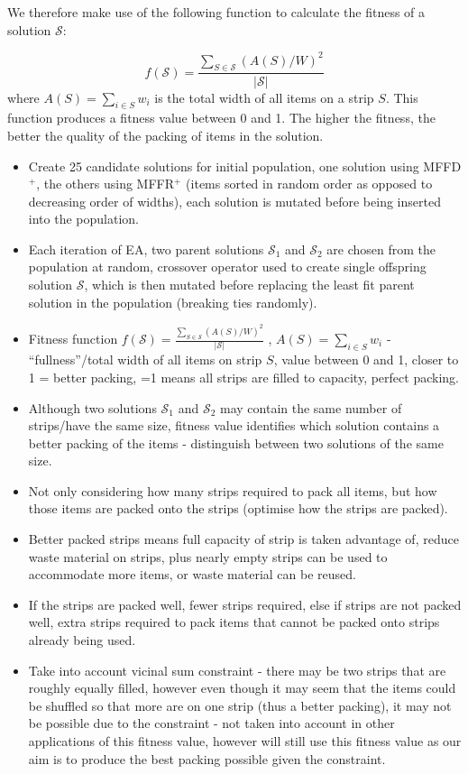 \documentclass{elsarticle}
\begin{document}
We therefore make use of the following function to calculate the fitness of a solution $\mathcal{S}$:

\begin{equation}
	f(\mathcal{S}) = \frac{\sum_{S \in \mathcal{S}} (A(S)/W)^2}{|\mathcal{S}|}
\end{equation}
\noindent where $A(S) = \sum_{i \in S} w_i$ is the total width of all items on a strip $S$. This function produces a fitness value between 0 and 1. The higher the fitness, the better the quality of the packing of items in the solution.

\begin{itemize}
	\item Create 25 candidate solutions for initial population, one solution using MFFD$^+$, the others using MFFR$^+$ (items sorted in random order as opposed to decreasing order of widths), each solution is mutated before being inserted into the population.
	\item Each iteration of EA, two parent solutions $\mathcal{S}_1$ and $\mathcal{S}_2$ are chosen from the population at random, crossover operator used to create single offspring solution $\mathcal{S}$, which is then mutated before replacing the least fit parent solution in the population (breaking ties randomly).
	\item Fitness function $f(\mathcal{S}) = \frac{\sum_{S \in \mathcal{S}} (A(S)/W)^2}{|\mathcal{S}|}$ \cite{falkenauer1992}, $A(S) = \sum_{i \in S} w_i$ - ``fullness''/total width of all items on strip $S$, value between 0 and 1, closer to 1 = better packing, =1 means all strips are filled to capacity, perfect packing.
	\item Although two solutions $\mathcal{S}_1$ and $\mathcal{S}_2$ may contain the same number of strips/have the same size, fitness value identifies which solution contains a better packing of the items - distinguish between two solutions of the same size.
	\item Not only considering how many strips required to pack all items, but how those items are packed onto the strips (optimise how the strips are packed).
	\item Better packed strips means full capacity of strip is taken advantage of, reduce waste material on strips, plus nearly empty strips can be used to accommodate more items, or waste material can be reused.
	\item If the strips are packed well, fewer strips required, else if strips are not packed well, extra strips required to pack items that cannot be packed onto strips already being used.
	\item Take into account vicinal sum constraint - there may be two strips that are roughly equally filled, however even though it may seem that the items could be shuffled so that more are on one strip (thus a better packing), it may not be possible due to the constraint - not taken into account in other applications of this fitness value, however will still use this fitness value as our aim is to produce the best packing possible given the constraint.
\end{itemize}
\end{document}

